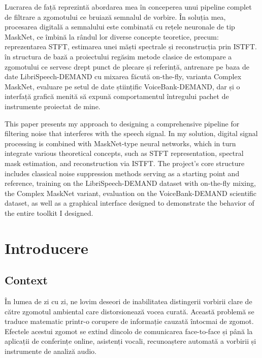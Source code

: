 \documentclass[12pt,a4paper]{report}
\newenvironment{abstractpage}
  {\clearpage\vspace*{\fill}\thispagestyle{empty}}
  {\vfill\clearpage}
\renewenvironment{abstract}[1]
  {\smallskip\selectlanguage{#1}%
   \begin{center}\bfseries\abstractname\end{center}\small}
  {\par\smallskip}
\begin{document}
\begin{abstractpage}
\begin{abstract}{romanian}
Lucrarea de față reprezintă abordarea mea în conceperea unui pipeline complet 
de filtrare a zgomotului ce bruiază semnalul de vorbire. În soluția mea, procesarea 
digitală a semnalului este combinată cu rețele neuronale de tip MaskNet, ce îmbină 
la rândul lor diverse concepte teoretice, precum: reprezentarea STFT, estimarea unei 
măști spectrale și reconstrucția prin ISTFT. în structura de bază a proiectului regăsim 
metode clasice de estompare a zgomotului ce servesc drept punct de plecare și referință, 
antrenare pe baza de date LibriSpeech-DEMAND cu mixarea făcută on-the-fly, varianta Complex 
MaskNet, evaluare pe setul de date științific VoiceBank-DEMAND, dar și o interfață grafică 
menită să expună comportamentul întregului pachet de instrumente proiectat de mine.
\end{abstract}

\begin{abstract}{english}
This paper presents my approach to designing a comprehensive pipeline for filtering noise 
that interferes with the speech signal. In my solution, digital signal processing is combined 
with MaskNet-type neural networks, which in turn integrate various theoretical concepts, such 
as STFT representation, spectral mask estimation, and reconstruction via ISTFT. The project’s core 
structure includes classical noise suppression methods serving as a starting point and reference, 
training on the LibriSpeech-DEMAND dataset with on-the-fly mixing, the Complex MaskNet variant, 
evaluation on the VoiceBank-DEMAND scientific dataset, as well as a graphical interface designed 
to demonstrate the behavior of the entire toolkit I designed.
\end{abstract}
\end{abstractpage}

\tableofcontents
\clearpage

\chapter{Introducere}

\section{Context}

În lumea de zi cu zi, ne lovim deseori de inabilitatea distingerii vorbirii clare de către 
zgomotul ambiental care distorsionează vocea curată. Această problemă se traduce matematic 
printr-o corupere de informație cauzată întocmai de zgomot. Efectele acestui zgomot se 
extind dincolo de comunicarea face-to-face și până la aplicații de conferințe online, 
asistenți vocali, recunoaștere automată a vorbirii și instrumente de analiză audio.
\end{document}
